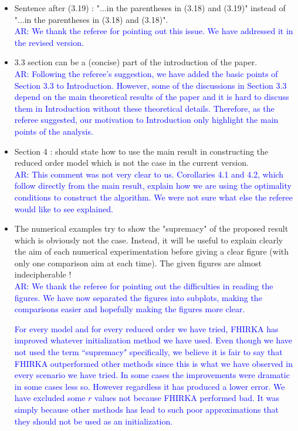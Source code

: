 \documentclass[11pt]{article}
\def\serkan#1{\textcolor{blue}{{#1}}}
\begin{document}
\begin{itemize}
\item Sentence after (3.19) : "...in the parentheses in (3.18) and (3.19)"
instead of "...in the parentheses in (3.18) and (3.18)". \\[1ex]
\serkan{\textsf{AR}:  We thank the referee for pointing out this issue. We have addressed it in the revised version.}

\item 3.3 section can be a (concise) part of the introduction of the paper. \\[1ex]
\serkan{\textsf{AR}:  Following the referee's suggestion, we have added the basic points of Section 3.3 to Introduction. However, some of the discussions in  Section 3.3 depend on the main theoretical results of the paper and it is hard to discuss them in Introduction without these theoretical details. Therefore, as the referee suggested, our motivation to Introduction only highlight the main points of the analysis.}

\item Section 4 : should state how to use the main result in constructing
the reduced order model which is not the case in the current version.\\
\serkan{\textsf{AR}:  This comment was not very clear to us.  Corollaries 4.1 and 4.2, which follow directly from the main result, explain how we are using the optimality conditions to construct the algorithm.  We were not sure what else the referee would like to see explained.}

\item The numerical examples try to show the "supremacy" of the proposed
result which is obviously not the case. Instead, it will be useful to
explain clearly the aim of each numerical experimentation before giving
a clear figure (with only one comparison aim at each time). The given
figures are almost indecipherable !\\[1ex]
\serkan{\textsf{AR}:  We thank the referee for pointing out the difficulties in reading the figures. We have now separated the figures into subplots, making the comparisons easier and hopefully making the figures more clear.
}

\textcolor{blue}{
 For every model and for every reduced order we have tried, FHIRKA has improved whatever initialization method we have used. Even though we have not used the term ``supremacy" specifically, we believe it is fair to say that  FHIRKA outperformed other methods since this is what we have observed in every scenario we have tried. In some cases the improvements were dramatic in some cases less so. However regardless it has produced a lower error. We have excluded some $r$ values not because FHIRKA performed bad. It was simply because other methods has lead to such poor approximations that they should not be used as an initialization.}

\end{itemize}
\end{document}
